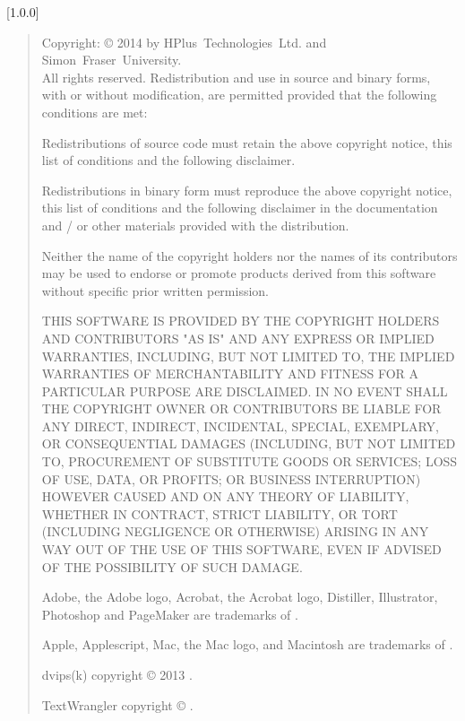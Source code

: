 [1.0.0]
\begin{quote}
\begin{small}
Copyright: \copyright{} 2014 by HPlus~Technologies~Ltd. and Simon~Fraser~University.
\\
All rights reserved. Redistribution and use in source and binary forms, with or without
modification, are permitted provided that the following conditions are met:
\begin{tightItems}
\item Redistributions of source code must retain the above copyright notice, this list of
conditions and the following disclaimer.
\item Redistributions in binary form must reproduce the above copyright notice, this list
of conditions and the following disclaimer in the documentation and / or other materials
provided with the distribution.
\item Neither the name of the copyright holders nor the names of its contributors may be
used to endorse or promote products derived from this software without specific prior
written permission.
\end{tightItems}
THIS SOFTWARE IS PROVIDED BY THE COPYRIGHT HOLDERS AND CONTRIBUTORS "AS IS" AND ANY
EXPRESS OR IMPLIED WARRANTIES, INCLUDING, BUT NOT LIMITED TO, THE IMPLIED WARRANTIES OF
MERCHANTABILITY AND FITNESS FOR A PARTICULAR PURPOSE ARE DISCLAIMED.
IN NO EVENT SHALL THE COPYRIGHT OWNER OR CONTRIBUTORS BE LIABLE FOR ANY DIRECT, INDIRECT,
INCIDENTAL, SPECIAL, EXEMPLARY, OR CONSEQUENTIAL DAMAGES (INCLUDING, BUT NOT LIMITED TO,
PROCUREMENT OF SUBSTITUTE GOODS OR SERVICES; LOSS OF USE, DATA, OR PROFITS; OR BUSINESS
INTERRUPTION) HOWEVER CAUSED AND ON ANY THEORY OF LIABILITY, WHETHER IN CONTRACT, STRICT
LIABILITY, OR TORT (INCLUDING NEGLIGENCE OR OTHERWISE) ARISING IN ANY WAY OUT OF THE USE
OF THIS SOFTWARE, EVEN IF ADVISED OF THE POSSIBILITY OF SUCH DAMAGE.

Adobe, the Adobe logo, Acrobat, the Acrobat logo, Distiller, Illustrator, Photoshop and
PageMaker are trademarks of
.

Apple, Applescript, Mac, the Mac logo, and Macintosh are trademarks of
.

dvips(k) copyright \copyright{} 2013
.

TextWrangler copyright \copyright{}
.


\end{small}
\end{quote}
